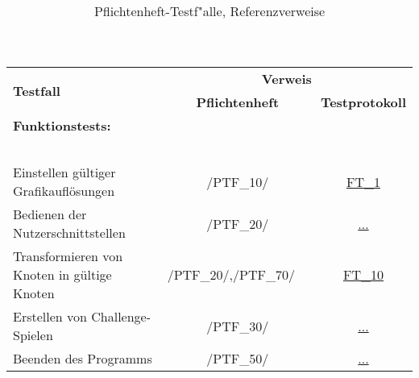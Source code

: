 \begin{longtable}{p{0.5\hsize}p{0.275\hsize}p{0.275\hsize}}

	\caption{Pflichtenheft-Testf{"a}lle, Referenzverweise\\~\\~\\}
	\label{Pflichtenheft:Tests:Referenzverweise}
	\\


	    \multirow{2}{*}{\textbf{Testfall}}
	  & \multicolumn{2}{c}{\textbf{Verweis}}
	  
	  \\ [14pt]
	  
	  & \multicolumn{1}{c}{\textbf{Pflichtenheft}}
	  & \multicolumn{1}{c}{\textbf{Testprotokoll}}
	  
	  \\ 
	     


	  \multicolumn{3}{l}{\textbf{Funktionstests:}}
	  
	\\
	
	  \multicolumn{3}{l}{~}
	  
	\\

	  \multicolumn{1}{L{6.5cm}}{Einstellen gültiger Grafikauflösungen}
	& \multicolumn{1}{c}{/PTF\_10/}
	& \multicolumn{1}{c}{\hyperref[FT:1]{FT\_1}}
	
	\\
	
	
	  \multicolumn{1}{L{6.5cm}}{Bedienen der Nutzerschnittstellen}
	& \multicolumn{1}{c}{/PTF\_20/}
	& \multicolumn{1}{c}{\hyperref[]{...}}
		
	\\

	  \multicolumn{1}{L{6.5cm}}{Transformieren von Knoten in gültige Knoten}
	& \multicolumn{1}{C{3cm}}{/PTF\_20/,\newline/PTF\_70/~~}
	& \multicolumn{1}{c}{\hyperref[FT:10]{FT\_10}}
	
	\\
	
	 \multicolumn{1}{L{6.5cm}}{Erstellen von Challenge-Spielen}
	& \multicolumn{1}{c}{/PTF\_30/}
	& \multicolumn{1}{c}{\hyperref[]{...}}
	
	\\
	
	  \multicolumn{1}{L{6.5cm}}{Beenden des Programms}
	& \multicolumn{1}{c}{/PTF\_50/}
	& \multicolumn{1}{c}{\hyperref[]{...}}
	

\end{longtable}
